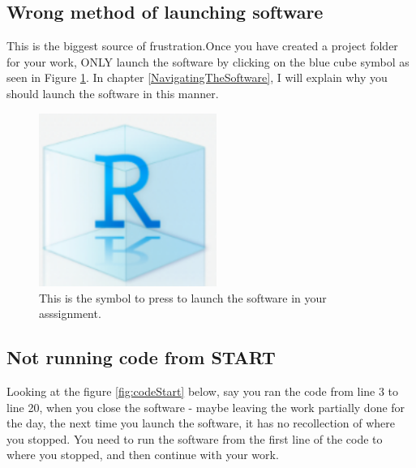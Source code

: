 \documentclass[
]{book}
\begin{document}
\hypertarget{wrong-method-of-launching-software}{%
\subsection{Wrong method of launching software}\label{wrong-method-of-launching-software}}

This is the biggest source of frustration.Once you have created a project folder for your work, ONLY launch the software by clicking on the blue cube symbol as seen in Figure \ref{fig:launching}. In chapter \ref{NavigatingTheSoftware}, I will explain why you should launch the software in this manner.

\begin{figure}

\includegraphics[width=2.28in]{images/index/rstudio_projects} \hfill{}

\caption{This is the symbol to press to launch the software in your asssignment.}\label{fig:launching}
\end{figure}

\hypertarget{not-running-code-from-start}{%
\subsection{Not running code from START}\label{not-running-code-from-start}}

Looking at the figure \ref{fig:codeStart} below, say you ran the code from line 3 to line 20, when you close the software - maybe leaving the work partially done for the day, the next time you launch the software, it has no recollection of where you stopped. You need to run the software from the first line of the code to where you stopped, and then continue with your work.
\end{document}
